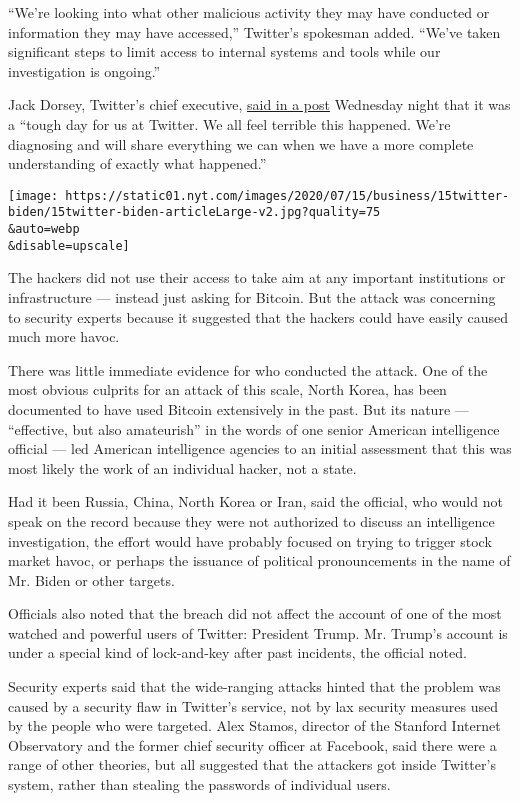 ``We're looking into what other malicious activity they may have
conducted or information they may have accessed,'' Twitter's spokesman
added. ``We've taken significant steps to limit access to internal
systems and tools while our investigation is ongoing.''

Jack Dorsey, Twitter's chief executive,
\href{https://twitter.com/jack/status/1283571658339397632?s=21}{said in
a post} Wednesday night that it was a ``tough day for us at Twitter. We
all feel terrible this happened. We're diagnosing and will share
everything we can when we have a more complete understanding of exactly
what happened.''

\texttt{[image: https://static01.nyt.com/images/2020/07/15/business/15twitter-biden/15twitter-biden-articleLarge-v2.jpg?quality=75\\\&auto=webp\\\&disable=upscale]}

The hackers did not use their access to take aim at any important
institutions or infrastructure --- instead just asking for Bitcoin. But
the attack was concerning to security experts because it suggested that
the hackers could have easily caused much more havoc.

There was little immediate evidence for who conducted the attack. One of
the most obvious culprits for an attack of this scale, North Korea, has
been documented to have used Bitcoin extensively in the past. But its
nature --- ``effective, but also amateurish'' in the words of one senior
American intelligence official --- led American intelligence agencies to
an initial assessment that this was most likely the work of an
individual hacker, not a state.

Had it been Russia, China, North Korea or Iran, said the official, who
would not speak on the record because they were not authorized to
discuss an intelligence investigation, the effort would have probably
focused on trying to trigger stock market havoc, or perhaps the issuance
of political pronouncements in the name of Mr. Biden or other targets.

Officials also noted that the breach did not affect the account of one
of the most watched and powerful users of Twitter: President Trump. Mr.
Trump's account is under a special kind of lock-and-key after past
incidents, the official noted.

Security experts said that the wide-ranging attacks hinted that the
problem was caused by a security flaw in Twitter's service, not by lax
security measures used by the people who were targeted. Alex Stamos,
director of the Stanford Internet Observatory and the former chief
security officer at Facebook, said there were a range of other theories,
but all suggested that the attackers got inside Twitter's system, rather
than stealing the passwords of individual users.

